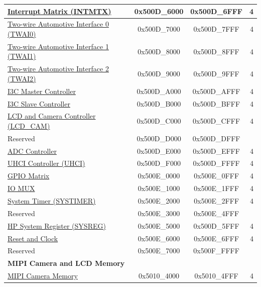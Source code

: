 \begin{ThreePartTable}
\begin{longtable}[c]{ |p{7cm}|c|c|r| }
\hyperref[mod:intmtrx]{Interrupt Matrix (INTMTX)} & 0x500D\_6000 & 0x500D\_6FFF &   4 \\\hline
\hyperref[mod:twai]{Two-wire Automotive Interface 0 (TWAI0)}     & 0x500D\_7000 & 0x500D\_7FFF &   4 \\\hline
\hyperref[mod:twai]{Two-wire Automotive Interface 1 (TWAI1)}     & 0x500D\_8000 & 0x500D\_8FFF &   4 \\\hline
\hyperref[mod:twai]{Two-wire Automotive Interface 2 (TWAI2)}     & 0x500D\_9000 & 0x500D\_9FFF &   4 \\\hline
\hyperref[mod:i3c]{I3C Master Controller}                & 0x500D\_A000 & 0x500D\_AFFF &   4 \\\hline
\hyperref[mod:i3c]{I3C Slave Controller}                    & 0x500D\_B000 & 0x500D\_BFFF &   4 \\\hline
\hyperref[mod:camlcdctrl]{LCD and Camera Controller (LCD\_CAM)}        & 0x500D\_C000 & 0x500D\_CFFF &   4 \\\hline
\rowcolor{gray!25}  Reserved                      & 0x500D\_D000 & 0x500D\_DFFF &     \\\hline
\hyperref[mod:adc]{ADC Controller}                & 0x500D\_E000 & 0x500D\_EFFF &   4 \\\hline
\hyperref[mod:uart]{UHCI Controller (UHCI)}       & 0x500D\_F000 & 0x500D\_FFFF &   4 \\\hline
\hyperref[mod:iomuxgpio]{GPIO Matrix}             & 0x500E\_0000 & 0x500E\_0FFF &   4 \\\hline
\hyperref[mod:iomuxgpio]{IO MUX}                  & 0x500E\_1000 & 0x500E\_1FFF &   4 \\\hline
\hyperref[mod:systimer]{System Timer (SYSTIMER)}  & 0x500E\_2000 & 0x500E\_2FFF &   4 \\\hline
\rowcolor{gray!25}  Reserved                      & 0x500E\_3000 & 0x500E\_4FFF &    \\\hline
\hyperref[mod:sysreg]{HP System Register (SYSREG)}               & 0x500E\_5000 & 0x500D\_5FFF &   4 \\\hline
\hyperref[mod:resclk]{Reset and Clock}            & 0x500E\_6000 & 0x500E\_6FFF &   4 \\\hline
\rowcolor{gray!25}  Reserved                      & 0x500E\_7000 & 0x500F\_FFFF &    \\\hline
\multicolumn{4}{|l|}{\textbf{MIPI Camera and LCD Memory}} \\ \hline
\hyperref[mod:mipicsi]{MIPI Camera Memory}        & 0x5010\_4000 & 0x5010\_4FFF &   4 \\\hline

\end{longtable}
\end{ThreePartTable}
